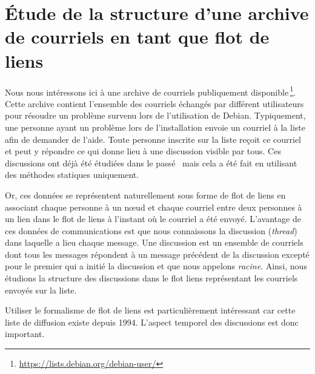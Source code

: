 

\chapter{Étude de la structure d'une archive de courriels en tant que flot de liens}
\minitoc
{}
\label{chap:mailing}


Nous nous intéressons ici à une archive de courriels publiquement disponible\,\footnote{\url{https://lists.debian.org/debian-user/}}.
Cette archive contient l'ensemble des courriels échangés par différent utilisateurs pour résoudre un problème survenu lors de l'utilisation de Debian.
Typiquement, une personne ayant un problème lors de l'installation envoie un courriel à la liste afin de demander de l'aide.
Toute personne inscrite sur la liste reçoit ce courriel et peut y répondre ce qui donne lieu à une discussion visible par tous.
Ces discussions ont déjà été étudiées dans le passé~\cite{dorat2007,sowe2006,wang2014} mais cela a été fait en utilisant des méthodes statiques uniquement.

Or, ces données se représentent naturellement sous forme de flot de liens en associant chaque personne à un n\oe{}ud et chaque courriel entre deux personnes à un lien dans le flot de liens à l'instant où le courriel a été envoyé.
L'avantage de ces données de communications est que nous connaissons la discussion (\emph{thread}) dans laquelle a lieu chaque message.
Une discussion est un ensemble de courriels dont tous les messages répondent à un message précédent de la discussion excepté pour le premier qui a initié la discussion et que nous appelons \emph{racine}.
Ainsi, nous étudions la structure des discussions dans le flot liens représentant les courriels envoyés sur la liste.

Utiliser le formalisme de flot de liens est particulièrement intéressant car cette liste de diffusion existe depuis 1994.
L'aspect temporel des discussions est donc important.



